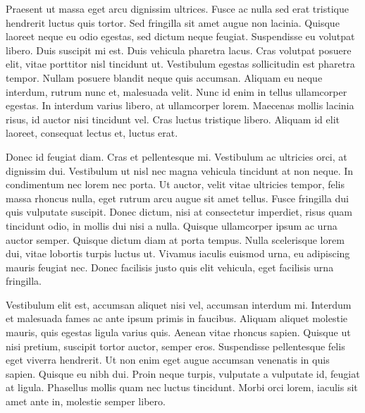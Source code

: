 Praesent ut massa eget arcu dignissim ultrices. Fusce ac nulla sed erat tristique hendrerit luctus quis tortor. Sed fringilla sit amet augue non lacinia. Quisque laoreet neque eu odio egestas, sed dictum neque feugiat. Suspendisse eu volutpat libero. Duis suscipit mi est. Duis vehicula pharetra lacus. Cras volutpat posuere elit, vitae porttitor nisl tincidunt ut. Vestibulum egestas sollicitudin est pharetra tempor. Nullam posuere blandit neque quis accumsan. Aliquam eu neque interdum, rutrum nunc et, malesuada velit. Nunc id enim in tellus ullamcorper egestas. In interdum varius libero, at ullamcorper lorem. Maecenas mollis lacinia risus, id auctor nisi tincidunt vel. Cras luctus tristique libero. Aliquam id elit laoreet, consequat lectus et, luctus erat.

Donec id feugiat diam. Cras et pellentesque mi. Vestibulum ac ultricies orci, at dignissim dui. Vestibulum ut nisl nec magna vehicula tincidunt at non neque. In condimentum nec lorem nec porta. Ut auctor, velit vitae ultricies tempor, felis massa rhoncus nulla, eget rutrum arcu augue sit amet tellus. Fusce fringilla dui quis vulputate suscipit. Donec dictum, nisi at consectetur imperdiet, risus quam tincidunt odio, in mollis dui nisi a nulla. Quisque ullamcorper ipsum ac urna auctor semper. Quisque dictum diam at porta tempus. Nulla scelerisque lorem dui, vitae lobortis turpis luctus ut. Vivamus iaculis euismod urna, eu adipiscing mauris feugiat nec. Donec facilisis justo quis elit vehicula, eget facilisis urna fringilla.

Vestibulum elit est, accumsan aliquet nisi vel, accumsan interdum mi. Interdum et malesuada fames ac ante ipsum primis in faucibus. Aliquam aliquet molestie mauris, quis egestas ligula varius quis. Aenean vitae rhoncus sapien. Quisque ut nisi pretium, suscipit tortor auctor, semper eros. Suspendisse pellentesque felis eget viverra hendrerit. Ut non enim eget augue accumsan venenatis in quis sapien. Quisque eu nibh dui. Proin neque turpis, vulputate a vulputate id, feugiat at ligula. Phasellus mollis quam nec luctus tincidunt. Morbi orci lorem, iaculis sit amet ante in, molestie semper libero.